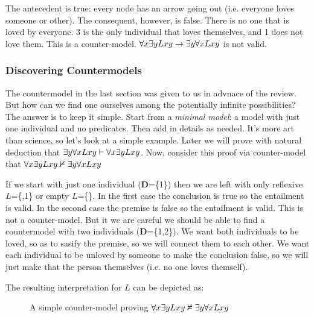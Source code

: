 The antecedent is true: every node has an arrow going out (i.e. everyone loves
someone or other). The consequent, however, is false. There is no one that is
loved by everyone. 3 is the only individual that loves themselves, and 1 does
not love them. This is a counter-model.
$\forall x\exists yLxy\rightarrow\exists y\forall xLxy$ is not valid.

\subsubsection{Discovering Countermodels}


The countermodel in the last section was given to us in advnace of the review.
But how can we find one ourselves among the potentially infinite possibilities?
The answer is to keep it simple. Start from a \emph{minimal model}: a model with
just one individual and no predicates. Then add in details as needed. It's more
art than science, so let's look at a simple example. Later we will prove with
natural deduction that $\exists y\forall xLxy\vdash\forall x\exists yLxy$.
Now, consider this proof via counter-model that
$\forall x\exists yLxy\nvDash\exists y\forall xLxy$

If we start with just one individual (\textbf{D}=\{1\}) then we are left with
only reflexive $L$=\{,1\textrangle\} or empty $L$=\{\}. In the
first case the conclusion is true so the entailment is valid. In the second case
the premise is false so the entailment is valid. This is not a counter-model.
But it we are careful we should be able to find a countermodel with two
individuals (\textbf{D}=\{1,2\}). We want both individuals to be loved, so as
to sasify the premise, so we will connect them to each other. We want each
individual to be unloved by someone to make the conclusion false, so we will
just make that the person themselves (i.e. no one loves themself).

The resulting interpretation for $L$ can be depicted as:

\begin{figure}[h]
  \label{mod:minimal-symmetric}  
  \begin{center}
  \end{center}
  \caption{A simple counter-model proving
    $\forall x\exists yLxy\nvDash\exists y\forall xLxy$}
\end{figure}
  

